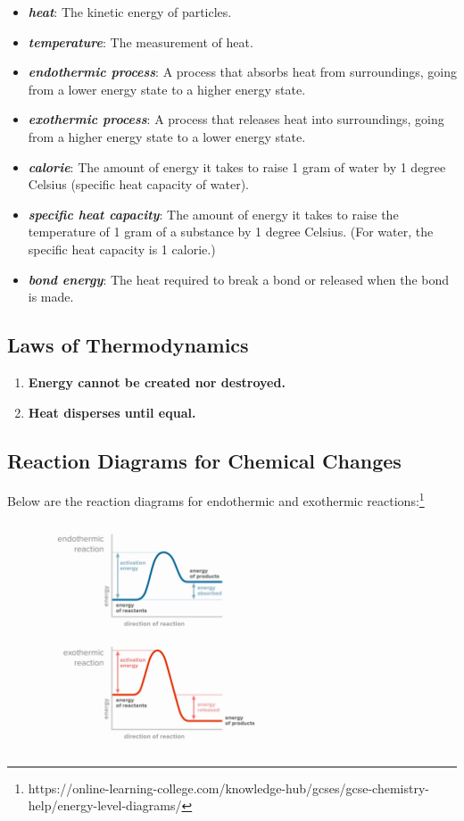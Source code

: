 \documentclass[a4paper, 12pt]{article}
\begin{document}
\begin{itemize}[leftmargin=*, nosep]
\item \textbf{\textit{heat}}: The kinetic energy of particles.
\item \textbf{\textit{temperature}}: The measurement of heat.
\item \textbf{\textit{endothermic process}}: A process that absorbs heat from surroundings, going from a lower energy state to a higher energy state.
\item \textbf{\textit{exothermic process}}: A process that releases heat into surroundings, going from a higher energy state to a lower energy state.
\item \textbf{\textit{calorie}}: The amount of energy it takes to raise 1 gram of water by 1 degree Celsius (specific heat capacity of water).
\item \textbf{\textit{specific heat capacity}}: The amount of energy it takes to raise the temperature of 1 gram of a substance by 1 degree Celsius. (For water, the specific heat capacity is 1 calorie.)
\item \textbf{\textit{bond energy}}: The heat required to break a bond or released when the bond is made.
\end{itemize}

\subsection*{Laws of Thermodynamics}

\begin{enumerate}[leftmargin=*, nosep]
\item \textbf{Energy cannot be created nor destroyed.}
\item \textbf{Heat disperses until equal.}
\end{enumerate}

\subsection*{Reaction Diagrams for Chemical Changes}
Below are the reaction diagrams for endothermic and exothermic reactions:\footnote{https://online-learning-college.com/knowledge-hub/gcses/gcse-chemistry-help/energy-level-diagrams/}

\begin{figure}[H]
\centering
\includegraphics[width=0.6\textwidth]{eldiag.jpg}
\end{figure}
\end{document}
